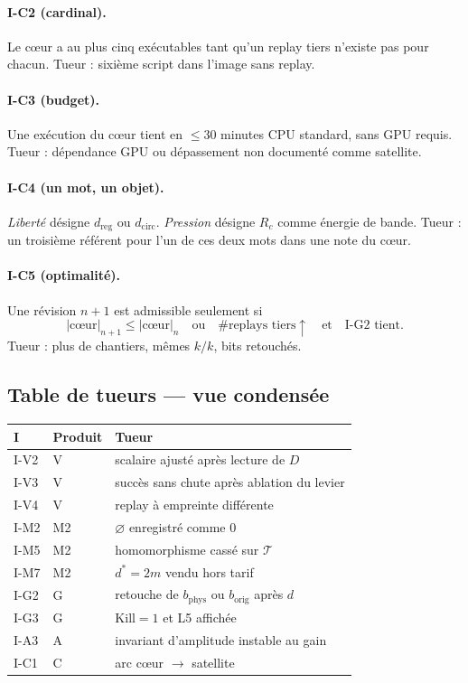 \documentclass[11pt,a4paper]{article}
\theoremstyle{definition}
\begin{document}
\paragraph{I-C2 (cardinal).}
Le cœur a au plus cinq exécutables tant qu'un replay tiers n'existe pas pour chacun.
Tueur : sixième script dans l'image sans replay.

\paragraph{I-C3 (budget).}
Une exécution du cœur tient en $\le 30$ minutes CPU standard, sans GPU requis.
Tueur : dépendance GPU ou dépassement non documenté comme satellite.

\paragraph{I-C4 (un mot, un objet).}
\emph{Liberté} désigne $d_{\mathrm{reg}}$ ou $d_{\mathrm{circ}}$.
\emph{Pression} désigne $R_{c}$ comme énergie de bande.
Tueur : un troisième référent pour l'un de ces deux mots dans une note du cœur.

\paragraph{I-C5 (optimalité).}
Une révision $n+1$ est admissible seulement si
\[
|\text{cœur}|_{n+1}\le |\text{cœur}|_{n}
\quad\text{ou}\quad
\#\text{replays tiers}\uparrow
\quad\text{et}\quad
\text{I-G2 tient}.
\]
Tueur : plus de chantiers, mêmes $k/k$, bits retouchés.

\subsection{Table de tueurs --- vue condensée}

{\small
\begin{center}
\begin{tabular}{@{}llp{78mm}@{}}
\toprule
\textbf{I} & \textbf{Produit} & \textbf{Tueur} \\
\midrule
I-V2 & V & scalaire ajusté après lecture de $D$ \\
I-V3 & V & succès sans chute après ablation du levier \\
I-V4 & V & replay à empreinte différente \\
I-M2 & M2 & $\varnothing$ enregistré comme $0$ \\
I-M5 & M2 & homomorphisme cassé sur $\mathcal{T}$ \\
I-M7 & M2 & $d^{*}=2m$ vendu hors tarif \\
I-G2 & G & retouche de $b_{\mathrm{phys}}$ ou $b_{\mathrm{orig}}$ après $d$ \\
I-G3 & G & $\mathrm{Kill}=1$ et L5 affichée \\
I-A3 & A & invariant d'amplitude instable au gain \\
I-C1 & C & arc cœur $\to$ satellite \\
\bottomrule
\end{tabular}
\end{center}
}
\end{document}
